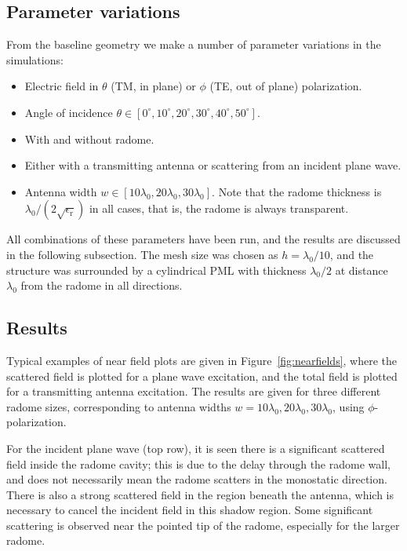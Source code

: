 \documentclass[a4paper,12pt]{article}
\newcommand{\mrm}[1]{\mathrm{#1}}
\begin{document}
\subsection{Parameter variations}

From the baseline geometry we make a number of parameter variations in
the simulations:
\begin{itemize}
\item Electric field in $\theta$ (TM, in plane) or $\phi$ (TE, out of
  plane) polarization.
\item Angle of incidence $\theta\in[0^{\circ},10^{\circ},20^{\circ},30^{\circ},40^{\circ},50^{\circ}]$.
\item With and without radome.
\item Either with a transmitting antenna or scattering from an
  incident plane wave.
\item Antenna width
  $w\in[10\lambda_{0},20\lambda_{0},30\lambda_{0}]$. Note that the
  radome thickness is $\lambda_{0}/(2\sqrt{\epsilon_{\mrm{r}}})$ in
  all cases, that is, the radome is always transparent.
\end{itemize}
All combinations of these parameters have been run, and the results
are discussed in the following subsection. The mesh size was chosen as
$h=\lambda_{0}/10$, and the structure was surrounded by a cylindrical
PML with thickness $\lambda_{0}/2$ at distance $\lambda_{0}$ from the
radome in all directions.

\subsection{Results}
\label{sec:results}

Typical examples of near field plots are given in
Figure~\ref{fig:nearfields}, where the scattered field is plotted for
a plane wave excitation, and the total field is plotted for a
transmitting antenna excitation. The results are given for three
different radome sizes, corresponding to antenna widths
$w=10\lambda_{0},20\lambda_{0},30\lambda_{0}$, using
$\phi$-polarization.

For the incident plane wave (top row), it is seen there is a
significant scattered field inside the radome cavity; this is due to
the delay through the radome wall, and does not necessarily mean the
radome scatters in the monostatic direction. There is also a strong
scattered field in the region beneath the antenna, which is necessary
to cancel the incident field in this shadow region. Some significant
scattering is observed near the pointed tip of the radome, especially
for the larger radome.
\end{document}
